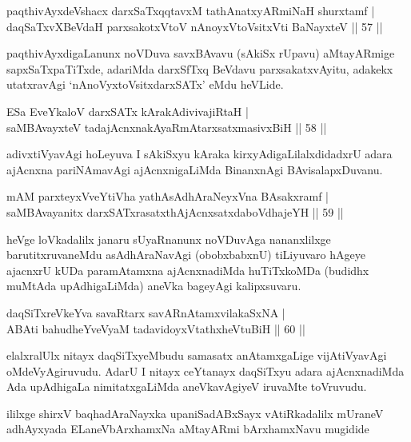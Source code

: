 \begin{shl}
paqthivAyxdeVshacx darxSaTxqqtavxM tathA\s natxyARmiNaH shurxtamf |\\
daqSaTxvXBeVdaH parxsakotxV\s toV nAnoyxV\s toV\s sitxVti BaNayxteV \hfill || 57 ||
\end{shl}

\begin{artha}
paqthivAyxdigaLanunx noVDuva savxBAvavu (sAkiSx rUpavu) aMtayARmige sapxSaTxpaTiTxde, adariMda darxSfTxq BeVdavu parxsakatxvAyitu, adakekx utatxravAgi `nAnoVyxtoV\s sitxdarxSATx' eMdu heVLide.
\end{artha}


\begin{shl}
ESa EveYkaloV darxSATx kArakAdivivajiRtaH |\\
saMBAvayxteV tadajAcnxnakAyaRmAtarxsatxmasivxBiH \hfill || 58 ||
\end{shl}

\begin{artha}
adivxtiVyavAgi hoLeyuva I sAkiSxyu kAraka kirxyAdigaLilalxdidadxrU adara ajAcnxna pariNAmavAgi ajAcnxnigaLiMda BinanxnAgi BAvisalapxDuvanu.
\end{artha}

\begin{shl}
mAM parxteyxVveYtiVha yathA\s sAdhAraNeyxVna BAsakxramf |\\
saMBAvayanitx darxSATxrasatxthA\s jAcnxsatxdaboVdhajeYH \hfill || 59 ||
\end{shl}

\begin{artha}
heVge loVkadalilx janaru sUyaRnanunx noVDuvAga nananxlilxge barutitxruvaneMdu asAdhAraNavAgi (obobxbabxnU) tiLiyuvaro hAgeye ajacnxrU kUDa paramAtamxna ajAcnxnadiMda huTiTxkoMDa (budidhx muMtAda upAdhigaLiMda) aneVka bageyAgi kalipxsuvaru.
\end{artha}%


\begin{shl}
daqSiTxreVkeYva savaRtarx savARnAtamxvilakaSxNA |\\
ABAti bahudheYveVyaM tadavidoyxVtathxheVtuBiH \hfill || 60 ||
\end{shl}

\begin{artha}
elalxralUlx nitayx daqSiTxyeMbudu samasatx anAtamxgaLige vijAtiVyavAgi oMdeVyAgiruvudu. AdarU I nitayx ceYtanayx daqSiTxyu adara ajAcnxnadiMda Ada upAdhigaLa nimitatxgaLiMda aneVkavAgiyeV iruvaMte toVruvudu.
\end{artha}

\begin{center}
ililxge shirxV baqhadAraNayxka upaniSadABxSayx vAtiRkadalilx mUraneV adhAyxyada ELaneVbArxhamxNa aMtayARmi bArxhamxNavu mugidide
\end{center}
